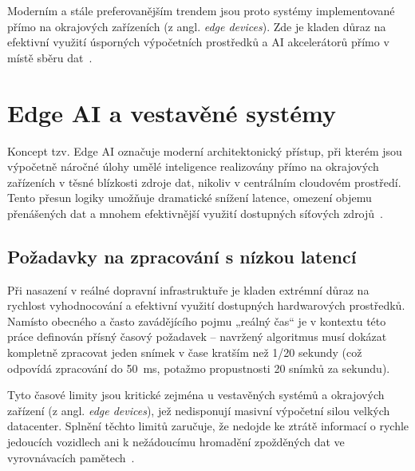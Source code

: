 \documentclass[male,czech,api_bc]{kitheses}
\begin{document}
Moderním a stále preferovanějším trendem jsou proto systémy implementované přímo na okrajových zařízeních (z angl. \textit{edge devices}). Zde je kladen důraz na efektivní využití úsporných výpočetních prostředků a AI akcelerátorů přímo v místě sběru dat~\cite{li_edge_ai_2020}.


\section{Edge AI a vestavěné systémy}
Koncept tzv. Edge AI označuje moderní architektonický přístup, při kterém jsou výpočetně náročné úlohy umělé inteligence realizovány přímo na okrajových zařízeních v těsné blízkosti zdroje dat, nikoliv v centrálním cloudovém prostředí. Tento přesun logiky umožňuje dramatické snížení latence, omezení objemu přenášených dat a mnohem efektivnější využití dostupných síťových zdrojů~\cite{li_edge_ai_2020}.

\subsection{Požadavky na zpracování s nízkou latencí}
Při nasazení v reálné dopravní infrastruktuře je kladen extrémní důraz na rychlost vyhodnocování a efektivní využití dostupných hardwarových prostředků. Namísto obecného a často zavádějícího pojmu „reálný čas“ je v kontextu této práce definován přísný časový požadavek – navržený algoritmus musí dokázat kompletně zpracovat jeden snímek v čase kratším než 1/20 sekundy (což odpovídá zpracování do 50~ms, potažmo propustnosti 20 snímků za sekundu).

Tyto časové limity jsou kritické zejména u vestavěných systémů a okrajových zařízení (z angl. \textit{edge devices}), jež nedisponují masivní výpočetní silou velkých datacenter. Splnění těchto limitů zaručuje, že nedojde ke ztrátě informací o rychle jedoucích vozidlech ani k nežádoucímu hromadění zpožděných dat ve vyrovnávacích pamětech~\cite{hailo_alpr_2024}.
\end{document}
